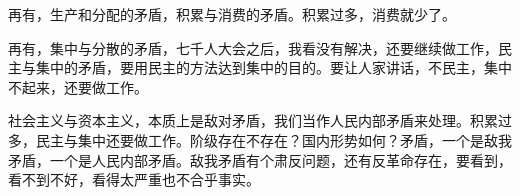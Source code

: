 再有，生产和分配的矛盾，积累与消费的矛盾。积累过多，消费就少了。

再有，集中与分散的矛盾，七千人大会之后，我看没有解决，还要继续做工作，民主与集中的矛盾，要用民主的方法达到集中的目的。要让人家讲话，不民主，集中不起来，还要做工作。

社会主义与资本主义，本质上是敌对矛盾，我们当作人民内部矛盾来处理。积累过多，民主与集中还要做工作。阶级存在不存在？国内形势如何？矛盾，一个是敌我矛盾，一个是人民内部矛盾。敌我矛盾有个肃反问题，还有反革命存在，要看到，看不到不好，看得太严重也不合乎事实。


